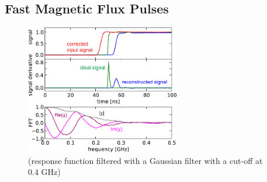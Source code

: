 \subsection{Fast Magnetic Flux Pulses}

\begin{figure}
   \flushright
	 \includegraphics[width=0.6\textwidth]{"./data/ct5/2011_04_04 - flux tomography/flux tomography"}
	 \caption[]{(response function filtered with a Gaussian filter with a cut-off at 0.4 GHz)}
	 \label{fig:FluxLineResponseFunction}
\end{figure}

